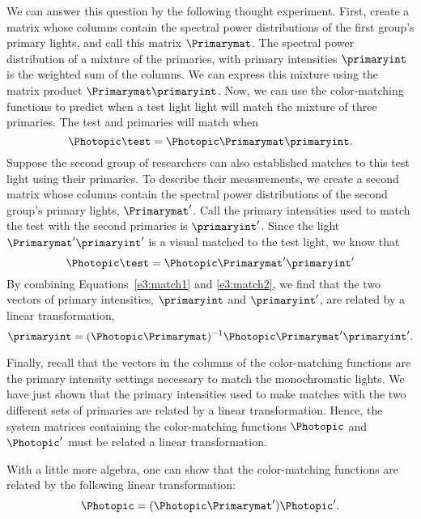 We can answer this question by the following thought experiment.
First, create a matrix
whose columns contain the spectral power
distributions of the first group's
primary lights, and call this matrix $\Primarymat$.
The spectral power distribution of a mixture of the primaries,
with primary intensities $\primaryint$
is the weighted sum of the columns.
We can express this mixture using
the matrix product $\Primarymat \primaryint$.
Now, we can use the color-matching functions to predict
when a test light light will match the mixture
of three primaries.
The test and primaries will match when
\begin{equation}
\label{e3:match1}
\Photopic \test = \Photopic \Primarymat \primaryint .
\end{equation}
Suppose the second group of researchers can also
established matches to this test light
using their primaries.
To describe their measurements,
we create a second matrix whose columns
contain the spectral power
distributions of the second group's primary lights,
$\Primarymat '$.
Call the primary intensities used to match
the test with the second primaries is $\primaryint '$.
Since the light $\Primarymat ' \primaryint '$ is a visual
matched to the test light, we know that
\begin{equation}
\label{e3:match2}
\Photopic \test = \Photopic \Primarymat ' \primaryint '
\end{equation}
By combining Equations~\ref{e3:match1} and \ref{e3:match2},
we find that the two vectors
of primary intensities, $\primaryint$ and $\primaryint '$,
are related by a linear transformation,
\[
\primaryint = 
  (\Photopic \Primarymat )^{-1}\Photopic \Primarymat ' \primaryint ' .
\]

Finally, recall that the vectors in the
columns of the color-matching functions
are the primary intensity settings
necessary to match the monochromatic lights.
We have just shown that the primary intensities used
to make matches with the two different sets of primaries
are related by a linear transformation.
Hence, the system matrices containing
the color-matching functions $\Photopic$ and
$\Photopic '$ must be related a linear transformation.

With a little more algebra, one can show that the
color-matching functions are related by the following
linear transformation:
\begin{equation}
\Photopic = ( \Photopic \Primarymat ' ) \Photopic ' .
\end{equation}

